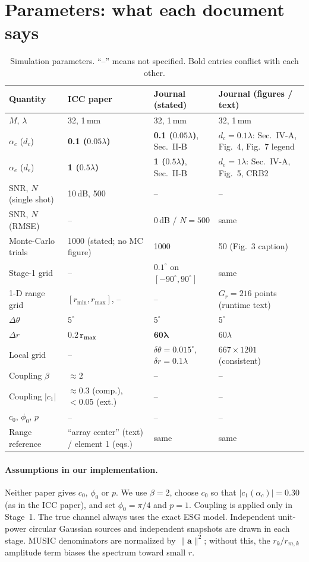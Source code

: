 \documentclass[11pt,a4paper]{article}
\newcommand{\dc}{d_c}\newcommand{\de}{d_e}
\begin{document}
\section{Parameters: what each document says}
\begin{table}[!htbp]\centering\small
\caption{Simulation parameters. ``--'' means not specified. Bold entries conflict with each other.}
\label{tab:params}
\begin{tabular}{@{}p{3.6cm}p{3.1cm}p{3.4cm}p{3.9cm}@{}}
\toprule
Quantity & ICC paper & Journal (stated) & Journal (figures / text) \\
\midrule
$M$, $\lambda$ & 32, 1\,mm & 32, 1\,mm & 32, 1\,mm \\
$\alpha_c$ ($\dc$) & \textbf{0.1 ($0.05\lambda$)} & \textbf{0.1 ($0.05\lambda$)}, Sec.~II-B & \textbf{$\dc=0.1\lambda$}: Sec.~IV-A, Fig.~4, Fig.~7 legend \\
$\alpha_e$ ($\de$) & \textbf{1 ($0.5\lambda$)} & \textbf{1 ($0.5\lambda$)}, Sec.~II-B & \textbf{$\de=1\lambda$}: Sec.~IV-A, Fig.~5, CRB2 \\
SNR, $N$ (single shot) & 10\,dB, 500 & -- & -- \\
SNR, $N$ (RMSE) & -- & 0\,dB / $N{=}500$ & same \\
Monte-Carlo trials & 1000 (stated; no MC figure) & 1000 & 50 (Fig.~3 caption) \\
Stage-1 grid & -- & $0.1^\circ$ on $[-90^\circ,90^\circ]$ & same \\
1-D range grid & $[r_{\min},r_{\max}]$, -- & -- & $G_r=216$ points (runtime text) \\
$\Delta\theta$ & $5^\circ$ & $5^\circ$ & $5^\circ$ \\
$\Delta r$ & $\mathbf{0.2\,r_{\max}}$ & $\mathbf{60\lambda}$ & $60\lambda$ \\
Local grid & -- & $\delta\theta=0.015^\circ$, $\delta r=0.1\lambda$ & $667\times1201$ (consistent) \\
Coupling $\beta$ & $\approx2$ & -- & -- \\
Coupling $|c_1|$ & $\approx0.3$ (comp.), $<0.05$ (ext.) & -- & -- \\
$c_0$, $\phi_0$, $p$ & -- & -- & -- \\
Range reference & ``array center'' (text) / element 1 (eqs.) & same & same \\
\bottomrule
\end{tabular}
\end{table}

\paragraph{Assumptions in our implementation.} Neither paper gives $c_0$, $\phi_0$ or $p$. We use
$\beta=2$, choose $c_0$ so that $|c_1(\alpha_c)|=0.30$ (as in the ICC paper), and set $\phi_0=\pi/4$ and $p=1$.
Coupling is applied only in Stage~1. The true channel always uses the exact ESG model.
Independent unit-power circular Gaussian sources and independent snapshots are drawn in each
stage. MUSIC denominators are normalized by $\|\mathbf a\|^2$; without this, the $r_k/r_{m,k}$
amplitude term biases the spectrum toward small $r$.
\end{document}
